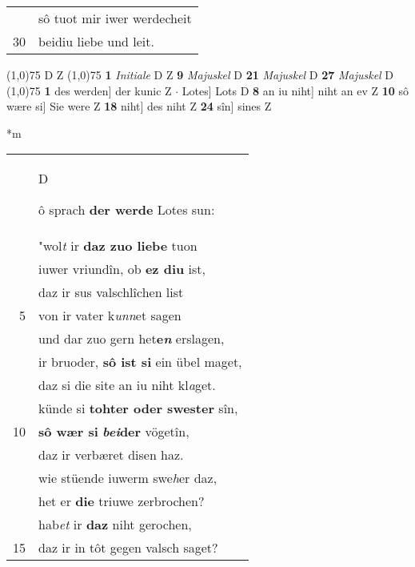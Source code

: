 \documentclass[8pt,a4paper,notitlepage]{article}
\begin{document}
\begin{table}[ht]
\begin{minipage}[t]{0.5\linewidth}
\begin{tabular}{rl}
 & sô tuot mir iwer werdecheit\\ 
30 & beidiu liebe und leit.\\ 
\end{tabular}
\scriptsize
\line(1,0){75} \newline
D Z \newline
\line(1,0){75} \newline
\textbf{1} \textit{Initiale} D Z  \textbf{9} \textit{Majuskel} D  \textbf{21} \textit{Majuskel} D  \textbf{27} \textit{Majuskel} D  \newline
\line(1,0){75} \newline
\textbf{1} des werden] der kunic Z  $\cdot$ Lotes] Lots D \textbf{8} an iu niht] niht an ev Z \textbf{10} sô wære si] Sie were Z \textbf{18} niht] des niht Z \textbf{24} sîn] sines Z \newline
\end{minipage}
\hspace{0.5cm}
\begin{minipage}[t]{0.5\linewidth}
\small
\begin{center}*m
\end{center}
\begin{tabular}{rl}
 & \begin{large}D\end{large}ô sprach \textbf{der werde} Lotes sun:\\ 
 & "wol\textit{t} ir \textbf{daz zuo liebe} tuon\\ 
 & iuwer vriundîn, ob \textbf{ez diu} ist,\\ 
 & daz ir sus valschlîchen list\\ 
5 & von ir vater k\textit{unn}et sagen\\ 
 & und dar zuo gern het\textbf{e\textit{n}} erslagen,\\ 
 & ir bruoder, \textbf{sô ist si} ein übel maget,\\ 
 & daz si die site an iu niht kl\textit{a}get.\\ 
 & künde si \textbf{tohter oder swester} sîn,\\ 
10 & \textbf{sô wær si} \textbf{\textit{bei}der} vögetîn,\\ 
 & daz ir verbæret disen haz.\\ 
 & wie stüende iuwerm swe\textit{h}er daz,\\ 
 & het er \textbf{die} triuwe zerbrochen?\\ 
 & hab\textit{et} ir \textbf{daz} niht gerochen,\\ 
15 & daz ir in tôt gegen valsch saget?\\ 

\end{tabular}
\end{minipage}
\end{table}
\end{document}
